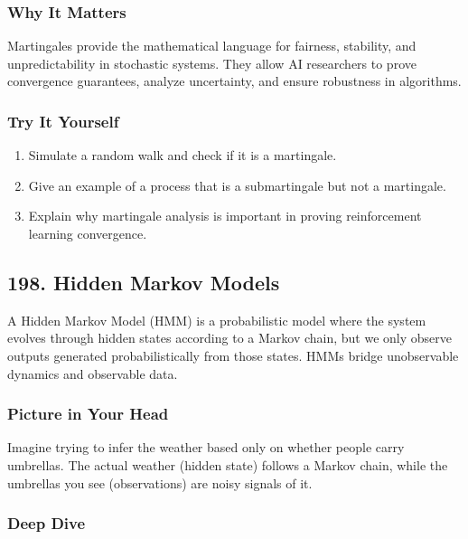 \documentclass[
  letterpaper,
  DIV=11,
  numbers=noendperiod]{scrreprt}
\providecommand{\tightlist}{%
  \setlength{\itemsep}{0pt}\setlength{\parskip}{0pt}}
\begin{document}
\subsubsection{Why It Matters}\label{why-it-matters-94}

Martingales provide the mathematical language for fairness, stability,
and unpredictability in stochastic systems. They allow AI researchers to
prove convergence guarantees, analyze uncertainty, and ensure robustness
in algorithms.

\subsubsection{Try It Yourself}\label{try-it-yourself-196}

\begin{enumerate}
\def\labelenumi{\arabic{enumi}.}
\tightlist
\item
  Simulate a random walk and check if it is a martingale.
\item
  Give an example of a process that is a submartingale but not a
  martingale.
\item
  Explain why martingale analysis is important in proving reinforcement
  learning convergence.
\end{enumerate}

\subsection{198. Hidden Markov Models}\label{hidden-markov-models}

A Hidden Markov Model (HMM) is a probabilistic model where the system
evolves through hidden states according to a Markov chain, but we only
observe outputs generated probabilistically from those states. HMMs
bridge unobservable dynamics and observable data.

\subsubsection{Picture in Your Head}\label{picture-in-your-head-197}

Imagine trying to infer the weather based only on whether people carry
umbrellas. The actual weather (hidden state) follows a Markov chain,
while the umbrellas you see (observations) are noisy signals of it.

\subsubsection{Deep Dive}\label{deep-dive-197}
\end{document}
